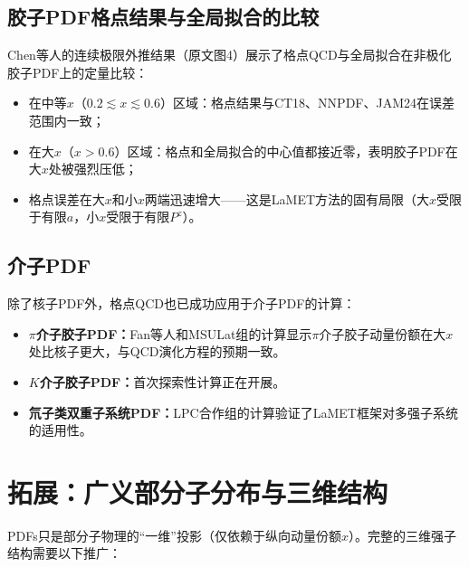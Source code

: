 \documentclass[12pt,a4paper]{ctexart}
\theoremstyle{definition}
\begin{document}
\subsection{胶子PDF格点结果与全局拟合的比较}

Chen等人\cite{Chen2025gluon}的连续极限外推结果（原文图4）展示了格点QCD与全局拟合在非极化胶子PDF上的定量比较：

\begin{itemize}
    \item 在中等$x$（$0.2 \lesssim x \lesssim 0.6$）区域：格点结果与CT18、NNPDF、JAM24在误差范围内一致；
    \item 在大$x$（$x > 0.6$）区域：格点和全局拟合的中心值都接近零，表明胶子PDF在大$x$处被强烈压低；
    \item 格点误差在大$x$和小$x$两端迅速增大——这是LaMET方法的固有局限（大$x$受限于有限$a$，小$x$受限于有限$P^z$）。
\end{itemize}

\subsection{介子PDF}

除了核子PDF外，格点QCD也已成功应用于介子PDF的计算：

\begin{itemize}
    \item \textbf{$\pi$介子胶子PDF：}Fan等人\cite{Fan2023pion}和MSULat组\cite{Lin2025gluon}的计算显示$\pi$介子胶子动量份额在大$x$处比核子更大，与QCD演化方程的预期一致。
    \item \textbf{$K$介子胶子PDF：}首次探索性计算\cite{Lin2025kaon}正在开展。
    \item \textbf{氘子类双重子系统PDF：}LPC合作组\cite{Chu2024deuteron}的计算验证了LaMET框架对多强子系统的适用性。
\end{itemize}

\section{拓展：广义部分子分布与三维结构}

PDFs只是部分子物理的``一维''投影（仅依赖于纵向动量份额$x$）。完整的三维强子结构需要以下推广\cite{Ji2013Euclidean}：
\end{document}
